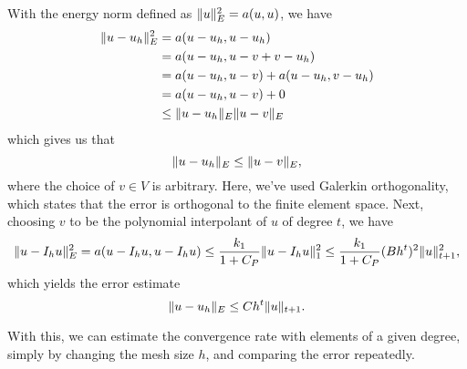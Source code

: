 With the energy norm defined as $\lVert u\rVert_E^2 = a(u, u)$, we have
\begin{align*}
    \lVert u - u_h\rVert_E^2 &= a(u - u_h, u - u_h) \\
    &= a(u - u_h, u - v + v - u_h) \\
    &= a(u - u_h, u - v) + a(u - u_h, v - u_h) \\
    &= a(u - u_h, u - v) + 0 \\
    &\leq \lVert u - u_h\rVert_E \lVert u - v\rVert_E
\end{align*}
which gives us that
\begin{equation}
    \lVert u - u_h\rVert_E \leq \lVert u - v\rVert_E,
\end{equation}
where the choice of $v \in V$ is arbitrary.
Here, we've used Galerkin orthogonality, which states that the error is orthogonal to the finite element space.
Next, choosing $v$ to be the polynomial interpolant of $u$ of degree $t$, we have
\begin{equation}
    \lVert u - I_h u\rVert_E^2 = a(u - I_h u, u - I_h u) \leq \frac{k_1}{1 + C_P} \lVert u - I_h u\rVert_1^2 \leq \frac{k_1}{1 + C_P} (B h^t)^2 \lVert u\rVert_{t+1}^2,
\end{equation}
which yields the error estimate
\begin{equation}
    \lVert u - u_h\rVert_E \leq C h^t \lVert u\rVert_{t+1}.
\end{equation}

With this, we can estimate the convergence rate with elements of a given degree, simply by changing the mesh size $h$, and comparing the error repeatedly.
